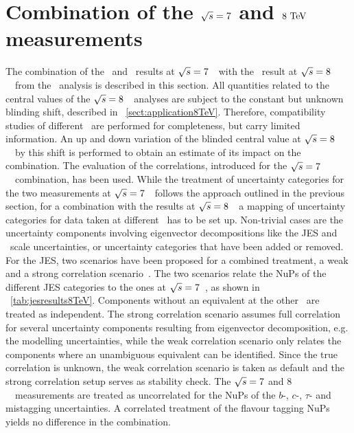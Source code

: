 \section[Combination of the \texorpdfstring{$\sqrts=7$}{sqrt(s)=7} and 8~\TeV\ measurements]{Combination of the \texorpdfstring{\boldmath$\sqrts=7$ and \boldmath$8~\mathrm{TeV}$}{sqrt(s)=7 and 8~\TeV} measurements}
\label{sec:resultcomb78TeV}
%
The combination of the \ttbarlj\ and \ttbarll\ results at $\sqrts=7$~\TeV\ with the \ttbarll\ result at ${\sqrt{s}}=8$~\TeV\ from the \mvabased\ analysis is described in this section. 
%
All quantities related to the central values of the ${\sqrt{s}}=8$~\TeV\ analyses are subject to the constant but unknown blinding shift, described in \sect~\ref{sect:application8TeV}. Therefore, compatibility studies of different \cmes\ are performed for completeness, but carry limited information. An up and down variation of the blinded central value at ${\sqrt{s}}=8$~\TeV\ by this shift is performed to obtain an estimate of its impact on the combination.
%
The evaluation of the correlations, introduced for the $\sqrts=7$~\TeV\ combination, has been used. While the treatment of uncertainty categories for the two measurements at $\sqrts=7$~\TeV\ follows the approach outlined in the previous section, for a combination with the results at ${\sqrt{s}}=8$~\TeV\ a mapping of uncertainty categories for data taken at different \cmes\ has to be set up. 
%
Non-trivial cases are the uncertainty components involving eigenvector decompositions like the \gls{JES} and \btag\ scale uncertainties, or uncertainty categories that have been added or removed. 
%
For the \gls{JES}, two scenarios have been proposed for a combined treatment, a weak and a strong correlation scenario~\cite{JEScorrelationScenarios}. The two scenarios relate the \glspl{NuP} of the different \gls{JES} categories to the ones at $\sqrts=7$~\TeV, as shown in \tab~\ref{tab:jesresults8TeV}. Components without an equivalent at the other \cme\ are treated as independent. The strong correlation scenario assumes full correlation for several uncertainty components resulting from eigenvector decomposition, e.g. the modelling uncertainties, while the weak correlation scenario only relates the components where an unambiguous equivalent can be identified. Since the true correlation is unknown, the weak correlation scenario is taken as default and the strong correlation setup serves as stability check.
%
The $\sqrts=7$ and $8$~\TeV\ measurements are treated as uncorrelated for the \glspl{NuP} of the $b$-, $c$-, $\tau$- and mistagging uncertainties. A correlated treatment of the flavour tagging \glspl{NuP} yields no difference in the combination.
